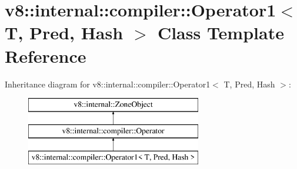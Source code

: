 \hypertarget{classv8_1_1internal_1_1compiler_1_1_operator1}{}\section{v8\+:\+:internal\+:\+:compiler\+:\+:Operator1$<$ T, Pred, Hash $>$ Class Template Reference}
\label{classv8_1_1internal_1_1compiler_1_1_operator1}
Inheritance diagram for v8\+:\+:internal\+:\+:compiler\+:\+:Operator1$<$ T, Pred, Hash $>$\+:\begin{figure}[H]
\begin{center}
\leavevmode
\includegraphics[height=3.000000cm]{classv8_1_1internal_1_1compiler_1_1_operator1}
\end{center}
\end{figure}
